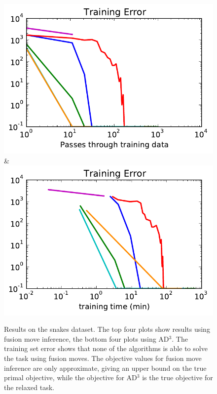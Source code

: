 \begin{figure}
\begin{tabu}
    \includegraphics[width=\linewidth]{evaluation/images/snakes_ad3_loss}&%
    \includegraphics[width=\linewidth]{evaluation/images/snakes_ad3_time_loss}
    \end{tabu}
\caption{%
    Results on the snakes dataset. The top four plots show results using fusion
    move inference, the bottom four plots using AD$^3$. The training set error shows
    that none of the algorithms is able to solve the task using fusion moves.
    The objective values for fusion move inference are only approximate, giving
    an upper bound on the true primal objective, while the objective for AD$^3$
    is the true objective for the relaxed task.
}
\end{figure}


